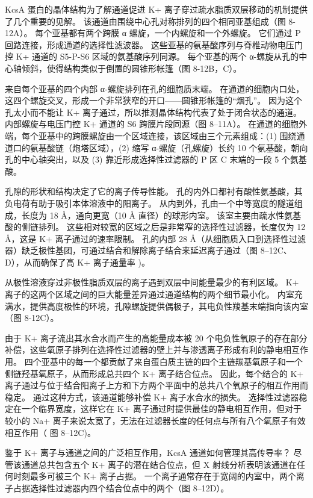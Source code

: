 KcsA 蛋白的晶体结构为了解通道促进 K+ 离子穿过疏水脂质双层移动的机制提供了几个重要的见解。 该通道由围绕中心孔对称排列的四个相同亚基组成（图 8-12A）。 每个亚基都有两个跨膜 α 螺旋，一个内螺旋和一个外螺旋。 它们通过 P 回路连接，形成通道的选择性滤波器。 这些亚基的氨基酸序列与脊椎动物电压门控 K+ 通道的 S5-P-S6 区域的氨基酸序列同源。 每个亚基的两个 α-螺旋从孔的中心轴倾斜，使得结构类似于倒置的圆锥形帐篷（图 8-12B，C）。

来自每个亚基的四个内部 α-螺旋排列在孔的细胞质末端。 在通道的细胞内口处，这四个螺旋交叉，形成一个非常狭窄的开口——圆锥形帐篷的“烟孔”。 因为这个孔太小而不能让 K+ 离子通过，所以推测晶体结构代表了处于闭合状态的通道。 内部螺旋与电压门控 K+ 通道的 S6 跨膜片段同源（图 8–11A）。 在通道的细胞外端，每个亚基中的跨膜螺旋由一个区域连接，该区域由三个元素组成：(1) 围绕通道口的氨基酸链（炮塔区域），(2) 缩写 α-螺旋（孔螺旋）长约 10 个氨基酸，朝向孔的中心轴突出，以及 (3) 靠近形成选择性过滤器的 P 区 C 末端的一段 5 个氨基酸。

孔隙的形状和结构决定了它的离子传导性能。 孔的内外口都衬有酸性氨基酸，其负电荷有助于吸引本体溶液中的阳离子。 从内到外，孔由一个中等宽度的隧道组成，长度为 18 Å，通向更宽（10 Å 直径）的球形内室。 该室主要由疏水性氨基酸的侧链排列。 这些相对较宽的区域之后是非常窄的选择性过滤器，长度仅为 12 Å，这是 K+ 离子通过的速率限制。 孔的内部 28 Å（从细胞质入口到选择性过滤器）缺乏极性基团，可通过结合和解除离子结合来延迟离子通过（图 8–12C、D），从而确保了高 K+ 离子通量率 )。

从极性溶液穿过非极性脂质双层的离子遇到双层中间能量最少的有利区域。 K+ 离子的这两个区域之间的巨大能量差异通过通道结构的两个细节最小化。 内室充满水，提供高度极性的环境，孔隙螺旋提供偶极子，其电负性羧基末端指向该内室（图 8-12C）。

由于 K+ 离子流出其水合水而产生的高能量成本被 20 个电负性氧原子的存在部分补偿，这些氧原子排列在选择性过滤器的壁上并与渗透离子形成有利的静电相互作用。 四个亚基中的每一个都贡献了来自蛋白质主链的四个主链羰基氧原子和一个侧链羟基氧原子，从而形成总共四个 K+ 离子结合位点。 因此，每个结合的 K+ 离子通过与位于结合阳离子上方和下方两个平面中的总共八个氧原子的相互作用而稳定。 通过这种方式，该通道能够补偿 K+ 离子水合水的损失。 选择性过滤器稳定在一个临界宽度，这样它在 K+ 离子通过时提供最佳的静电相互作用，但对于较小的 Na+ 离子来说太宽了，无法在过滤器长度的任何点与所有八个氧原子有效相互作用（ 图 8–12C)。

鉴于 K+ 离子与通道之间的广泛相互作用，KcsA 通道如何管理其高传导率？ 尽管该通道总共包含五个 K+ 离子的潜在结合位点，但 X 射线分析表明该通道在任何时刻最多可被三个 K+ 离子占据。 一个离子通常存在于宽阔的内室中，两个离子占据选择性过滤器内四个结合位点中的两个（图 8–12D）。

